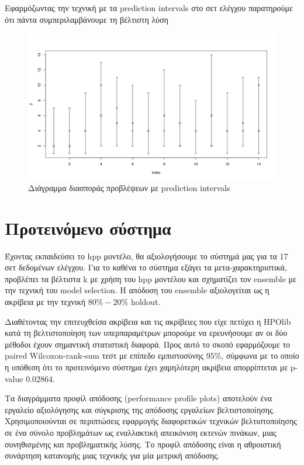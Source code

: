 \documentclass[]{article}
\numberwithin{equation}{section}		%
\numberwithin{figure}{section}			%
\numberwithin{table}{section}				%
\begin{document}
   Εφαρμόζωντας την τεχνική με τα prediction intervals στο σετ ελέγχου παρατηρούμε ότι πάντα συμπεριλαμβάνουμε τη βέλτιστη λύση
   \begin{figure}
   	\centering
   	\includegraphics[width=\linewidth, height=0.15\textheight]{intervals}
   	\caption{Διάγραμμα διασποράς προβλέψεων με prediction intervals }
   	\label{fig:1}
   \end{figure}%
   \section{Προτεινόμενο σύστημα}
  	Έχοντας εκπαιδεύσει το \gls{hpp} μοντέλο, θα αξιολογήσουμε το σύστημά μας για τα 17 σετ δεδομένων ελέγχου. Για το καθένα το σύστημα εξάγει τα μετα-χαρακτηριστικά, προβλέπει τα βέλτιστα k με χρήση του \gls{hpp} μοντέλου και σχηματίζει τον ensemble με την τεχνική του model selection. Η απόδοση του ensemble αξιολογείται ως η ακρίβεια με την τεχνική $80\% - 20\%$ holdout.
  	
  	Διαθέτοντας την επιτευχθείσα ακρίβεια και τις ακρίβειες που είχε πετύχει η HPOlib κατά τη βελτιστοποίηση των υπερπαραμέτρων μπορούμε να ερευνήσουμε αν οι δύο μέθοδοι έχουν σημαντική στατιστική διαφορά. Προς αυτό το σκοπό εφαρμόζουμε το paired Wilcoxon-rank-sum τεστ με επίπεδο εμπιστοσύνης $95\%$, σύμφωνα με το οποίο η υπόθεση ότι το προτεινόμενο σύστημα έχει χαμηλότερη ακρίβεια απορρίπτεται με p-value $0.02864$.
   	
 
   	Τα διαγράμματα προφίλ απόδοσης (performance profile plots) \citep{Dolan2002} αποτελούν ένα εργαλείο αξιολόγησης και σύγκρισης της απόδοσης εργαλείων βελτιστοποίησης. Χρησιμοποιούνται σε περιπτώσεις εφαρμογής διαφορετικών τεχνικών βελτιστοποίησης σε ένα σύνολο προβλημάτων ως εναλλακτική απεικόνιση εκτενών πινάκων, μιας συνηθισμένης και προβληματικής λύσης. Το προφίλ απόδοσης είναι η αθροιστική συνάρτηση κατανομής μιας τεχνικής για μία μετρική απόδοσης.
   	
\end{document}
